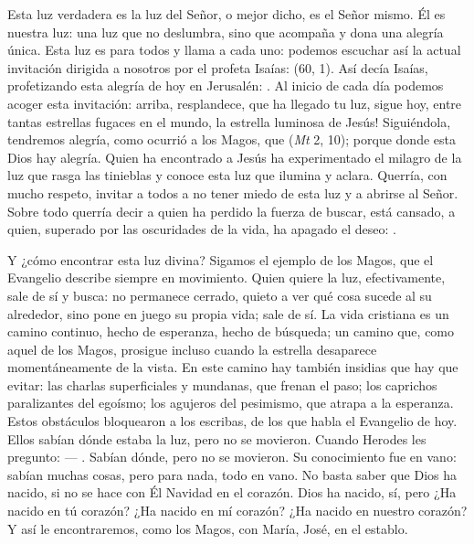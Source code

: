 {Esta luz verdadera es la luz del Señor, o mejor dicho, es el Señor mismo. Él es nuestra luz: una luz que no deslumbra, sino que acompaña y dona una alegría única. Esta luz es para todos y llama a cada uno: podemos escuchar así la actual invitación dirigida a nosotros por el profeta Isaías:  (60, 1). Así decía Isaías, profetizando esta alegría de hoy en Jerusalén: . Al inicio de cada día podemos acoger esta invitación: arriba, resplandece, que ha llegado tu luz, sigue hoy, entre tantas estrellas fugaces en el mundo, la estrella luminosa de Jesús! Siguiéndola, tendremos alegría, como ocurrió a los Magos, que  (\emph{Mt} 2, 10); porque donde esta Dios hay alegría. Quien ha encontrado a Jesús ha experimentado el milagro de la luz que rasga las tinieblas y conoce esta luz que ilumina y aclara. Querría, con mucho respeto, invitar a todos a no tener miedo de esta luz y a abrirse al Señor. Sobre todo querría decir a quien ha perdido la fuerza de buscar, está cansado, a quien, superado por las oscuridades de la vida, ha apagado el deseo: .

Y ¿cómo encontrar esta luz divina? Sigamos el ejemplo de los Magos, que el Evangelio describe siempre en movimiento. Quien quiere la luz, efectivamente, sale de sí y busca: no permanece cerrado, quieto a ver qué cosa sucede al su alrededor, sino pone en juego su propia vida; sale de sí. La vida cristiana es un camino continuo, hecho de esperanza, hecho de búsqueda; un camino que, como aquel de los Magos, prosigue incluso cuando la estrella desaparece momentáneamente de la vista. En este camino hay también insidias que hay que evitar: las charlas superficiales y mundanas, que frenan el paso; los caprichos paralizantes del egoísmo; los agujeros del pesimismo, que atrapa a la esperanza. Estos obstáculos bloquearon a los escribas, de los que habla el Evangelio de hoy. Ellos sabían dónde estaba la luz, pero no se movieron. Cuando Herodes les pregunto:  --- . Sabían dónde, pero no se movieron. Su conocimiento fue en vano: sabían muchas cosas, pero para nada, todo en vano. No basta saber que Dios ha nacido, si no se hace con Él Navidad en el corazón. Dios ha nacido, sí, pero ¿Ha nacido en tú corazón? ¿Ha nacido en mí corazón? ¿Ha nacido en nuestro corazón? Y así le encontraremos, como los Magos, con María, José, en el establo.

}
